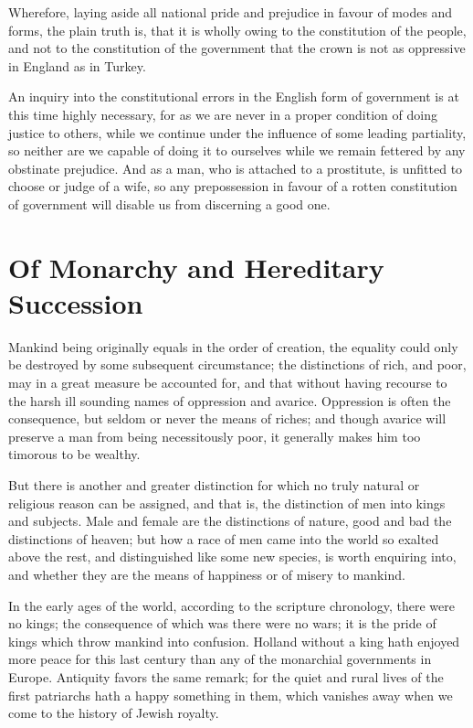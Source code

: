 \documentclass[12pt,oneside]{memoir}
\begin{document}
Wherefore, laying aside all national pride and prejudice in favour
of modes and forms, the plain truth is, that it is wholly owing to
the constitution of the people, and not to the constitution of the
government that the crown is not as oppressive in England as in
Turkey.

An inquiry into the constitutional errors in the English form of
government is at this time highly necessary, for as we are never in
a proper condition of doing justice to others, while we continue
under the influence of some leading partiality, so neither are we
capable of doing it to ourselves while we remain fettered by any
obstinate prejudice. And as a man, who is attached to a prostitute,
is unfitted to choose or judge of a wife, so any prepossession in
favour of a rotten constitution of government will disable us from
discerning a good one.

\section*{Of Monarchy and Hereditary Succession}

Mankind being originally equals in the order of creation, the
equality could only be destroyed by some subsequent circumstance;
the distinctions of rich, and poor, may in a great measure be
accounted for, and that without having recourse to the harsh ill
sounding names of oppression and avarice. Oppression is often the
consequence, but seldom or never the means of riches; and though
avarice will preserve a man from being necessitously poor, it
generally makes him too timorous to be wealthy.

But there is another and greater distinction for which no truly
natural or religious reason can be assigned, and that is, the
distinction of men into kings and subjects. Male and female are the
distinctions of nature, good and bad the distinctions of heaven; but
how a race of men came into the world so exalted above the rest, and
distinguished like some new species, is worth enquiring into, and
whether they are the means of happiness or of misery to mankind.

In the early ages of the world, according to the scripture
chronology, there were no kings; the consequence of which was there
were no wars; it is the pride of kings which throw mankind into
confusion. Holland without a king hath enjoyed more peace for this
last century than any of the monarchial governments in Europe.
Antiquity favors the same remark; for the quiet and rural lives of
the first patriarchs hath a happy something in them, which vanishes
away when we come to the history of Jewish royalty.
\end{document}
